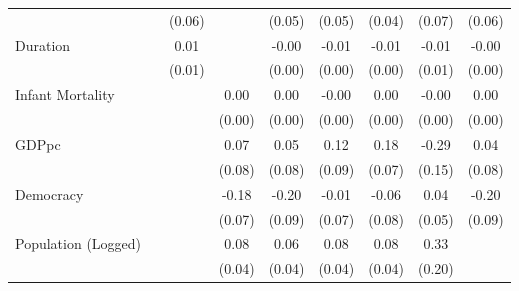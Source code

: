 \documentclass[12pt, letterpaper]{article}
\begin{document}
\begin{landscape}
\begin{table}[htbp]
\begin{small}
\begin{tabular}{l*{8}{c}}
                    &                     &      (0.06)         &                     &      (0.05)         &      (0.05)         &      (0.04)         &      (0.07)         &      (0.06)         \\
Duration            &                     &        0.01         &                     &       -0.00         &       -0.01         &       -0.01\sym{**} &       -0.01         &       -0.00         \\
                    &                     &      (0.01)         &                     &      (0.00)         &      (0.00)         &      (0.00)         &      (0.01)         &      (0.00)         \\
Infant Mortality    &                     &                     &        0.00         &        0.00         &       -0.00         &        0.00         &       -0.00         &        0.00         \\
                    &                     &                     &      (0.00)         &      (0.00)         &      (0.00)         &      (0.00)         &      (0.00)         &      (0.00)         \\
GDPpc               &                     &                     &        0.07         &        0.05         &        0.12         &        0.18\sym{**} &       -0.29\sym{*}  &        0.04         \\
                    &                     &                     &      (0.08)         &      (0.08)         &      (0.09)         &      (0.07)         &      (0.15)         &      (0.08)         \\
Democracy           &                     &                     &       -0.18\sym{**} &       -0.20\sym{**} &       -0.01         &       -0.06         &        0.04         &       -0.20\sym{**} \\
                    &                     &                     &      (0.07)         &      (0.09)         &      (0.07)         &      (0.08)         &      (0.05)         &      (0.09)         \\
Population (Logged) &                     &                     &        0.08\sym{**} &        0.06\sym{+}  &        0.08\sym{*}  &        0.08\sym{*}  &        0.33\sym{*}  &                     \\
                    &                     &                     &      (0.04)         &      (0.04)         &      (0.04)         &      (0.04)         &      (0.20)         &                     \\

\end{tabular}
\end{small}
\end{table}
\end{landscape}
\end{document}
